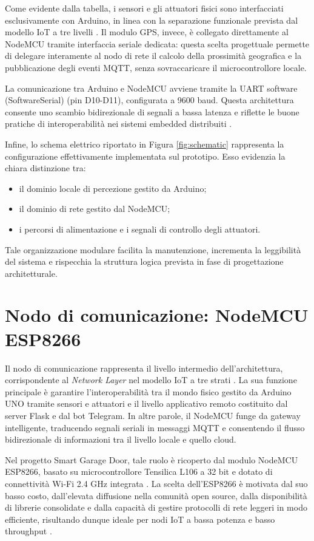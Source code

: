 Come evidente dalla tabella, i sensori e gli attuatori fisici sono interfacciati esclusivamente con Arduino, in linea con la separazione funzionale prevista dal modello IoT a tre livelli \cite{Gubbi2013}. Il modulo GPS, invece, è collegato direttamente al NodeMCU tramite interfaccia seriale dedicata: questa scelta progettuale permette di delegare interamente al nodo di rete il calcolo della prossimità geografica e la pubblicazione degli eventi MQTT, senza sovraccaricare il microcontrollore locale.

La comunicazione tra Arduino e NodeMCU avviene tramite la UART software (SoftwareSerial) (pin D10-D11), configurata a 9600 baud. Questa architettura consente uno scambio bidirezionale di segnali a bassa latenza e riflette le buone pratiche di interoperabilità nei sistemi embedded distribuiti \cite{Zanella2014}.

Infine, lo schema elettrico riportato in Figura \ref{fig:schematic} rappresenta la configurazione effettivamente implementata sul prototipo. Esso evidenzia la chiara distinzione tra:
\begin{itemize}
    \item il dominio locale di percezione gestito da Arduino;
    \item il dominio di rete gestito dal NodeMCU;
    \item i percorsi di alimentazione e i segnali di controllo degli attuatori.
\end{itemize}
Tale organizzazione modulare facilita la manutenzione, incrementa la leggibilità del sistema e rispecchia la struttura logica prevista in fase di progettazione architetturale.

\section{Nodo di comunicazione: NodeMCU ESP8266}
Il nodo di comunicazione rappresenta il livello intermedio dell'architettura, corrispondente al \textit{Network Layer} nel modello IoT a tre strati \cite{Gubbi2013}. La sua funzione principale è garantire l'interoperabilità tra il mondo fisico gestito da Arduino UNO tramite sensori e attuatori e il livello applicativo remoto costituito dal server Flask e dal bot Telegram. In altre parole, il NodeMCU funge da gateway intelligente, traducendo segnali seriali in messaggi MQTT e consentendo il flusso bidirezionale di informazioni tra il livello locale e quello cloud.

Nel progetto Smart Garage Door, tale ruolo è ricoperto dal modulo NodeMCU ESP8266, basato su microcontrollore Tensilica L106 a 32 bit e dotato di connettività Wi-Fi 2.4 GHz integrata \cite{ESP8266}. La scelta dell'ESP8266 è motivata dal suo basso costo, dall'elevata diffusione nella comunità open source, dalla disponibilità di librerie consolidate e dalla capacità di gestire protocolli di rete leggeri in modo efficiente, risultando dunque ideale per nodi IoT a bassa potenza e basso throughput \cite{Zanella2014}.

